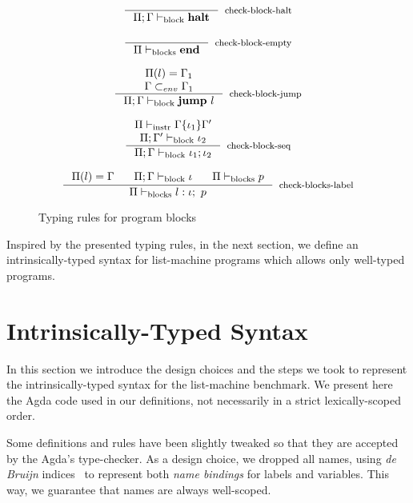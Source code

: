 \documentclass[review]{elsarticle}
\theoremstyle{definition}
\begin{document}
\begin{figure}[H]
\[
\begin{array}{c}
   \inference{}
             {\Pi;\Gamma\vdash_{\text{block}} \textbf{halt}}[check-block-halt]
   \\ \\
   \inference{}
             {\Pi\vdash_{\text{blocks}} \textbf{end}}[check-block-empty]\\ \\

   \inference{\Pi(l)=\Gamma_1\\ \Gamma \subset_{env} \Gamma_1}
             {\Pi;\Gamma\vdash_{\text{block}} \textbf{jump}~l}[check-block-jump]

   \\ \\

   \inference{\Pi\vdash_{\text{instr}} \Gamma\{\iota_1\}\Gamma'\\ \Pi;\Gamma'\vdash_{\text{block}} \iota_2}
             {\Pi;\Gamma\vdash_{\text{block}} \iota_1;\iota_2}[check-block-seq]
 \\ \\

   \inference{\Pi(l)=\Gamma\:\:\:\:\:\:\:\:\Pi;\Gamma\vdash_{\text{block}} \iota\:\:\:\:\:\:\:\:\Pi\vdash_{\text{blocks}} p}
     {\Pi\vdash_{\text{blocks}} l: \iota;~p}[check-blocks-label]
\end{array}
\]
\centering
\caption{Typing rules for program blocks}
\label{fig:typing-block}
\end{figure}
Inspired by the presented typing rules, in the next section, we define an
intrinsically-typed syntax for list-machine programs which allows
only well-typed pro\-grams.

\section{Intrinsically-Typed Syntax}\label{sec:typing}


In this section we introduce the design choices and the steps we took to represent the
intrinsically-typed syntax for the list-machine benchmark. We present here the Agda
code used in our definitions, not necessarily in a strict lexically-scoped order.

Some definitions and rules have been slightly tweaked so that they are accepted by
the Agda's type-checker. As a design choice, we dropped all names, using
\emph{de Bruijn} indices~\cite{DEBRUIJN72} to represent both \emph{name bindings}
for labels and variables. This way, we guarantee that names are always well-scoped.
\end{document}

